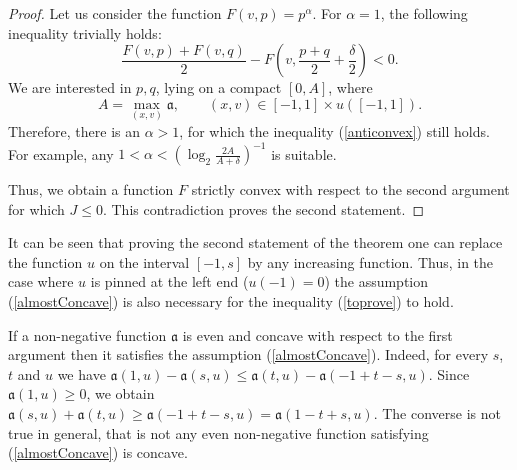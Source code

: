 \begin{proof}
Let us consider the function $F(v, p) = p ^ \alpha$.
For $\alpha = 1$, the following inequality trivially holds:
\begin{equation}
\label{anticonvex}
\frac{F(v, p) + F(v, q)}{ 2 } - F(v, \frac{p + q}{ 2 } + \frac{\delta}{ 2}) <0.
\end{equation}
We are interested in $p, q$, lying on a compact $[0 , A]$,
where 
$$A=\max \limits_{(x, v)} \mathfrak a,\qquad (x, v) \in [-1, 1 ] \times u([-1, 1] ).
$$
Therefore, there is an $\alpha> 1$, for which the inequality (\ref{anticonvex})
still holds.
For example, any $1 < \alpha < (\log_2 \frac{ 2 A}{A + \delta})^{-1}$ is suitable.

Thus, we obtain a function $F$ strictly convex with respect to the second argument
for which $J \le 0$. This contradiction proves the second statement.
\end{proof}

\begin{rem}
\label{landesNecessary}
It can be seen that proving the second statement of the theorem
one can replace the function $u$ on the interval $[-1, s]$ by any increasing function.
Thus, in the case where $u$ is pinned at the left end {\rm ($u(-1) = 0$)}
the assumption (\ref{almostConcave}) is also necessary for the inequality (\ref{toprove}) to hold.
\end{rem}

\begin{rem}
If a  non-negative function $\mathfrak a$ is even and concave with respect to the first argument then it satisfies the assumption (\ref{almostConcave}). 
Indeed, for every $s$, $t$ and $u$ we have $\mathfrak a( 1 , u) - \mathfrak a(s, u) \le \mathfrak a(t, u) - \mathfrak a(-1 + t - s, u)$.
Since $\mathfrak a(1 , u) \ge 0$, we obtain $\mathfrak a(s, u) + \mathfrak a(t, u) \ge \mathfrak a(-1 + t - s, u) = \mathfrak a( 1 - t + s, u)$.
The converse is not true in general, that is not any even
non-negative function satisfying (\ref{almostConcave}) is concave.
\end{rem}
